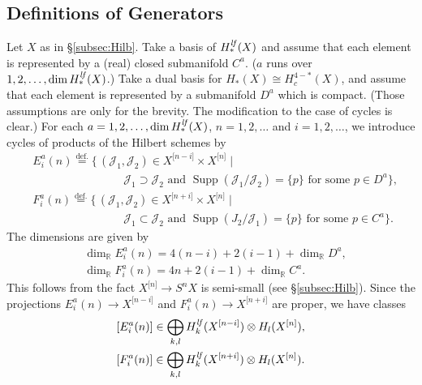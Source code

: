 \documentclass[12pt]{amsart}
\newcommand{\cal}{\mathcal}
\theoremstyle{definition}
\theoremstyle{remark}
\numberwithin{equation}{section}
\newcommand{\subsecref}[1]{\S\ref{#1}}
\newcommand{\defeq}{\overset{\operatorname{\scriptstyle def.}}{=}}
\newcommand{\R}{{\mathbb R}}
\newcommand{\Hilb}[2]{{#1}^{\lbrack{#2}\rbrack}} %
\newcommand{\Hilbn}[1]{\Hilb{#1}{n}}
\newcommand{\HilbX}[1]{\Hilb{X}{#1}}
\newcommand{\Hlf}{H^{\it lf}} %
\newcommand{\Supp}{\operatorname{Supp}} %
\begin{document}
\subsection{Definitions of Generators}
%
Let $X$ as in \subsecref{subsec:Hilb}.
Take a basis of $\Hlf_*(X)$ and
assume that each element is represented by a (real) closed submanifold
$C^a$. ($a$ runs over $1, 2, \dots, \dim \Hlf_*(X)$.)
Take a dual basis for $H_*(X)\cong H^{4 - *}_c(X)$, and assume
that each element is represented by a submanifold $D^a$ which is
compact.
(Those assumptions are only for the brevity. The modification to
the case of cycles is clear.)
For each $a = 1,2,\dots,\dim\Hlf_*(X)$, $n = 1,2,\dots$ and
$i=1,2,\dots$, we introduce cycles of products of the Hilbert
schemes by
\begin{equation*}
  \begin{split}
    &E_i^a(n) \defeq \{\, (\cal J_1,\cal J_2)\in\HilbX{n-i}\times\HilbX{n}
    \mid \\
    & \qquad\qquad\qquad\qquad\text{$\cal J_1\supset \cal J_2$ and
      $\Supp(\cal J_1/\cal J_2) = \{ p\}$ for some $p\in D^a$}
      \}, \\
    &F_i^a(n) \defeq \{\, (\cal J_1,\cal J_2)\in\HilbX{n+i}\times\HilbX{n}
    \mid \\
    & \qquad\qquad\qquad\qquad\text{$\cal J_1\subset \cal J_2$ and
      $\Supp (J_2/\cal J_1) = \{ p \}$ for some $p\in C^a$}\}.
  \end{split}
\end{equation*}
The dimensions are given by
\begin{align*}
  & \dim_\R E_i^a(n) = 4(n-i) + 2(i-1) + \dim_\R D^a,\\
  & \dim_\R F_i^a(n) = 4n + 2(i-1) + \dim_\R C^a.
\end{align*}
This follows from the fact $\Hilbn{X}\to S^n X$ is semi-small (see
\subsecref{subsec:Hilb}).
Since the projections
$E_i^a(n)\to \HilbX{n-i}$ and $F_i^a(n)\to\HilbX{n+i}$ are proper,
we have classes
\begin{align*}
  & [E_i^a(n)]\in \bigoplus_{k,l}
    \Hlf_k(\HilbX{n-i})\otimes H_l(\HilbX{n}), \\
  & [F_i^a(n)]\in \bigoplus_{k,l}
    \Hlf_k(\HilbX{n+i})\otimes H_l(\HilbX{n}).
\end{align*}
\end{document}
